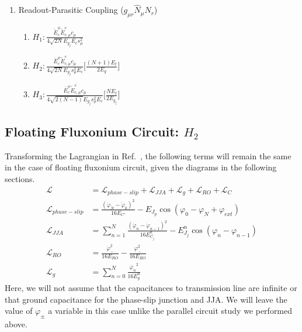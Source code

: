\documentclass[prx,showpacs,notitlepage,twocolumn,superscriptaddress,nofootinbib,preprintnumbers,floatfix]{revtex4-2}
\begin{document}
\begin{enumerate}
\item Readout-Parasitic Coupling ($g_{\mu r}\hat N_\mu \hat N_r$)
    \begin{enumerate}
        \item $H_1: \frac{\tilde{E}^\phi_c\tilde{E}^e_{c,\mu}c_\mu}{4\sqrt{2N}E_{g_j}E_cs_\mu^2}$
        \item $H_2:\frac{\bar{E}^\phi_c\tilde{E}^{e}_{c,\mu}c_\mu }{4\sqrt{2N}E_{g_j}s_\mu^2E_c}\Big[\frac{(N+1)E_t}{2E_g} \Big]$
        \item $H_3:\frac{\bar{E}^\phi_c\tilde{E}^{e}_{c,\mu}c_\mu }{4\sqrt{2(N-1)}E_{g_j}s_\mu^2E_c}\Big[\frac{NE_t}{2E_{g_j}} \Big]$
    \end{enumerate}
   
\end{enumerate}
\subsection{Floating Fluxonium Circuit: $H_2$}
Transforming the Lagrangian in Ref.~\cite{viola2015collective}, the following terms will remain the same in the case of floating fluxonium circuit, given the diagrams in the following sections.
\begin{align}
    \mathcal{L}&=\mathcal{L}_{phase-slip}+\mathcal{L}_{JJA}+\mathcal{L}_{g}+\mathcal{L}_{RO}+\mathcal{L}_{C}\\
    \mathcal{L}_{phase-slip}&=\frac{(\dot{\varphi}_N-\dot{\varphi}_0)^2}{16E_{C'}}-E_{J_p}\cos(\varphi_0-\varphi_{N}+\varphi_{ext})\\
    \mathcal{L}_{JJA}&=\sum_{n=1}^N\frac{(\dot{\varphi}_n-\dot{\varphi}_{n-1})^2}{16E^{n}_{C_j}}-E^{n}_{J_j}\cos(\varphi_n-\varphi_{n-1})\\
    \mathcal{L}_{RO}&=\frac{\dot{\varphi}_{-}^2}{16E_{{RO}}}-\frac{\varphi_{-}^2}{16E_{RO}}\\
    \mathcal{L}_{g}&=\sum_{n=0}^N \frac{\dot{\varphi_n}^2}{16E^n_{g}}\label{eq:float-float}
  \end{align}
  Here, we will not assume that the capacitances to transmission line are infinite or that ground capacitance for the phase-slip junction and JJA. We will leave the value of $\varphi_{\pm}$ a variable in this case unlike the parallel circuit study we performed above.
\end{document}
